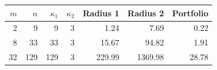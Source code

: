 \begin{tabular}{rrrrrrr}
\toprule
$m$ & $n$ & $\kappa_1$ & $\kappa_2$ & Radius 1 & Radius 2 & Portfolio \\
\midrule
2 & 9 & 9 & 3 & 1.24 & 7.69 & 0.22 \\
8 & 33 & 33 & 3 & 15.67 & 94.82 & 1.91 \\
32 & 129 & 129 & 3 & 229.99 & 1369.98 & 28.78 \\
\bottomrule
\end{tabular}
